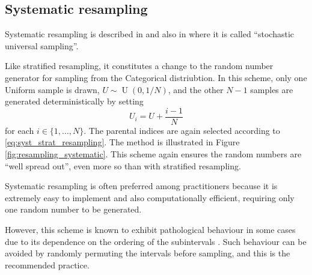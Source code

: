 \documentclass[fleqn]{article}
\theoremstyle{definition}
\begin{document}
\subsection{Systematic resampling}
Systematic resampling is described in \citet{carpenter1999} and also in \citet{whitley1994} where it is called ``stochastic universal sampling''.

Like stratified resampling, it constitutes a change to the random number generator for sampling from the Categorical distriubtion. 
In this scheme, only one Uniform sample is drawn, $U \sim \operatorname{U}(0,1/N)$, and the other $N-1$ samples are generated deterministically by setting
\begin{equation*}
U_i = U + \frac{i-1}{N}
\end{equation*}
for each $i \in \{1, \dots, N\}$.
The parental indices are again selected according to \eqref{eq:syst_strat_resampling}. 
The method is illustrated in Figure \ref{fig:resampling_systematic}.
This scheme again ensures the random numbers are ``well spread out'', even more so than with stratified resampling.

Systematic resampling is often preferred among practitioners because it is extremely easy to implement and also computationally efficient, requiring only one random number to be generated.

However, this scheme is known to exhibit pathological behaviour in some cases due to its dependence on the ordering of the subintervals \citep{douc2005}. Such behaviour can be avoided by randomly permuting the intervals before sampling, and this is the recommended practice. 
\end{document}
